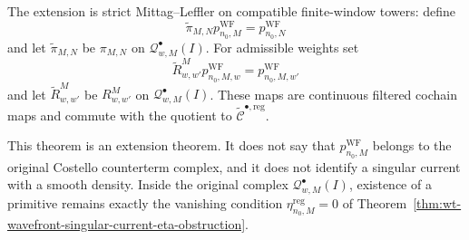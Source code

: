 \begin{thm}
  The extension is strict Mittag--Leffler on compatible finite-window
  towers: define
  \[
    \widetilde\pi_{M,N}p^{\mathrm{WF}}_{n_0,M}
      =
    p^{\mathrm{WF}}_{n_0,N}
  \]
  and let \(\widetilde\pi_{M,N}\) be \(\pi_{M,N}\) on
  \(\mathcal Q^\bullet_{w,M}(I)\).  For admissible weights set
  \[
    \widetilde R^M_{w,w'}p^{\mathrm{WF}}_{n_0,M,w}
      =
    p^{\mathrm{WF}}_{n_0,M,w'}
  \]
  and let \(\widetilde R^M_{w,w'}\) be \(R^M_{w,w'}\) on
  \(\mathcal Q^\bullet_{w,M}(I)\).  These maps are continuous filtered
  cochain maps and commute with the quotient to
  \(\widetilde{\mathcal C}^{\bullet,\mathrm{reg}}\).

  This theorem is an extension theorem.  It does not say that
  \(p^{\mathrm{WF}}_{n_0,M}\) belongs to the original Costello
  counterterm complex, and it does not identify a singular current with a
  smooth density.  Inside the original complex
  \(\mathcal Q^\bullet_{w,M}(I)\), existence of a primitive remains
  exactly the vanishing condition
  \(\eta^{\mathrm{reg}}_{n_0,M}=0\) of
  Theorem~\ref{thm:wt-wavefront-singular-current-eta-obstruction}.
\end{thm}

